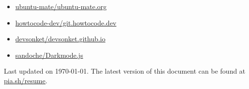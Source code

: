 \documentclass[10pt,a4paper,ragged2e]{altacv}
\begin{document}
\medskip

\begin{itemize}
\item \href{https://github.com/ubuntu-mate/ubuntu-mate.org/commits?author=maacpiash}{ubuntu-mate/ubuntu-mate.org}
\item \href{https://github.com/howtocode-dev/git.howtocode.dev/commits?author=maacpiash}{howtocode-dev/git.howtocode.dev}
\item \href{https://github.com/devsonket/devsonket.github.io/commits?author=maacpiash}{devsonket/devsonket.github.io}
\item \href{https://github.com/sandoche/Darkmode.js/commits?author=maacpiash}{sandoche/Darkmode.js}
\end{itemize}

\begin{fullwidth}

\medskip
\medskip
\medskip
\medskip

Last updated on \today. The latest version of this document can be found at \href{https://pia.sh/resume}{\underline{pia.sh/resume}}.

\end{fullwidth}



\end{document}
